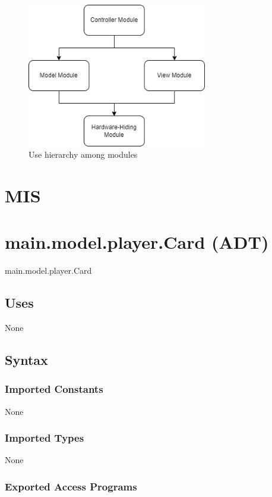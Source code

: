 \documentclass[12pt, titlepage]{article}
\begin{document}
\begin{figure}[H]
\centering
\includegraphics[width=0.7\textwidth]{Poker_UseDiagram.png}
\caption{Use hierarchy among modules}
\label{FigUH}
\end{figure}

\section{MIS}

\section* {main.model.player.Card (ADT)}

main.model.player.Card

\subsection* {Uses}

None

\subsection* {Syntax}

\subsubsection* {Imported Constants}

None

\subsubsection* {Imported Types}

None

\subsubsection* {Exported Access Programs}
\end{document}

